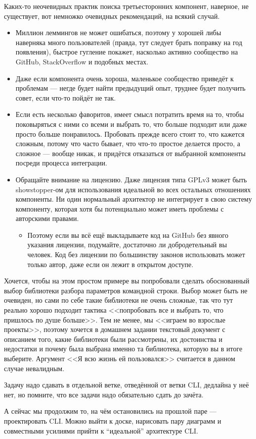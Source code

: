 \documentclass[a5paper]{article}
\begin{document}
Каких-то неочевидных практик поиска третьесторонних компонент, наверное, не существует, вот немножко очевидных рекомендаций, на всякий случай.
\begin{itemize}
	\item Миллион леммингов не может ошибаться, поэтому у хорошей либы наверняка много пользователей (правда, тут следует брать поправку на год появления), быстрое гугление покажет, насколько активно сообщество на GitHub, StackOverflow и подобных местах.
	\item Даже если компонента очень хороша, маленькое сообщество приведёт к проблемам --- негде будет найти предыдущий опыт, труднее будет получить совет, если что-то пойдёт не так.
	\item Если есть несколько фаворитов, имеет смысл потратить время на то, чтобы поковыряться с ними со всеми и выбрать то, что больше подходит или даже просто больше понравилось. Пробовать прежде всего стоит то, что кажется сложным, потому что часто бывает, что что-то простое делается просто, а сложное --- вообще никак, и придётся отказаться от выбранной компоненты посреди процесса интеграции. 
	\item Обращайте внимание на лицензию. Даже лицензия типа GPLv3 может быть showstopper-ом для использования идеальной во всех остальных отношениях компоненты. Ни один нормальный архитектор не интегрирует в свою систему компоненту, которая хотя бы потенциально может иметь проблемы с авторскими правами.
	\begin{itemize}
		\item Поэтому если вы всё ещё выкладываете код на GitHub без явного указания лицензии, подумайте, достаточно ли добродетельный вы человек. Код без лицензии по большинству законов использовать может только автор, даже если он лежит в открытом доступе.
	\end{itemize}
\end{itemize}

Хочется, чтобы на этом простом примере вы попробовали сделать обоснованный выбор библиотеки разбора параметров командной строки. Выбор может быть не очевиден, но сами по себе такие библиотеки не очень сложные, так что тут реально хорошо подходит тактика <<попробовать все и выбрать то, что пришлось по душе больше>>. Тем не менее, мы <<играем во взрослые проекты>>, поэтому хочется в домашнем задании текстовый документ с описанием того, какие библиотеки были рассмотрены, их достоинства и недостатки и почему была выбрана именно та библиотека, которую вы в итоге выберите. Аргумент <<Я всю жизнь ей пользовался>> считается в данном случае невалидным.

Задачу надо сдавать в отдельной ветке, отведённой от ветки CLI, дедлайна у неё нет, но помните, что все задачи надо обязательно сдать до зачёта.

А сейчас мы продолжим то, на чём остановились на прошлой паре --- проектировать CLI. Можно выйти к доске, нарисовать пару диаграмм и совместными усилиями прийти к ``идеальной'' архитектуре CLI.
\end{document}
